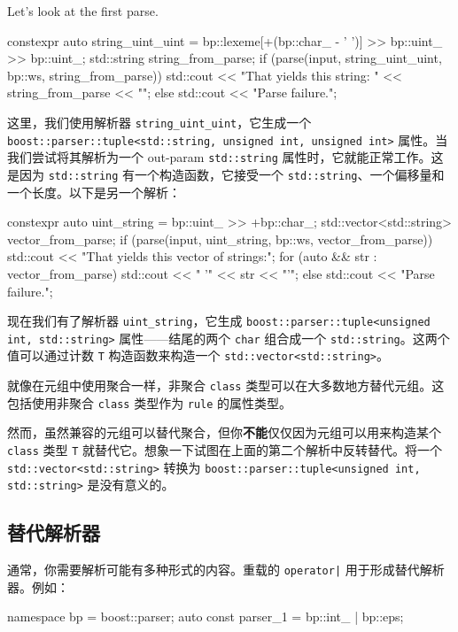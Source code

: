 Let's look at the first parse.

\begin{code}
constexpr auto string_uint_uint =
    bp::lexeme[+(bp::char_ - ' ')] >> bp::uint_ >> bp::uint_;
std::string string_from_parse;
if (parse(input, string_uint_uint, bp::ws, string_from_parse))
    std::cout << "That yields this string: " << string_from_parse << "\n";
else
    std::cout << "Parse failure.\n";
\end{code}

这里，我们使用解析器 \texttt{string\_uint\_uint}，它生成一个 \texttt{boost::parser::tuple<std::string, unsigned int, unsigned int>} 属性。当我们尝试将其解析为一个 out-param \texttt{std::string} 属性时，它就能正常工作。这是因为 \texttt{std::string} 有一个构造函数，它接受一个 \texttt{std::string}、一个偏移量和一个长度。以下是另一个解析：

\begin{code}
constexpr auto uint_string = bp::uint_ >> +bp::char_;
std::vector<std::string> vector_from_parse;
if (parse(input, uint_string, bp::ws, vector_from_parse)) {
    std::cout << "That yields this vector of strings:\n";
    for (auto && str : vector_from_parse) {
        std::cout << "  '" << str << "'\n";
    }
} else {
    std::cout << "Parse failure.\n";
}
\end{code}

现在我们有了解析器 \texttt{uint\_string}，它生成 \texttt{boost::parser::tuple<unsigned int, std::string>} 属性——结尾的两个 \texttt{char} 组合成一个 \texttt{std::string}。这两个值可以通过计数 \texttt{T} 构造函数来构造一个 \texttt{std::vector<std::string>}。

就像在元组中使用聚合一样，非聚合 \texttt{class} 类型可以在大多数地方替代元组。这包括使用非聚合 \texttt{class} 类型作为 \texttt{rule} 的属性类型。

然而，虽然兼容的元组可以替代聚合，但你\textbf{不能}仅仅因为元组可以用来构造某个 \texttt{class} 类型 \texttt{T} 就替代它。想象一下试图在上面的第二个解析中反转替代。将一个 \texttt{std::vector<std::string>} 转换为 \texttt{boost::parser::tuple<unsigned int, std::string>} 是没有意义的。

\subsection{替代解析器}

通常，你需要解析可能有多种形式的内容。重载的 \texttt{operator|} 用于形成替代解析器。例如：

\begin{code}
namespace bp = boost::parser;
auto const parser_1 = bp::int_ | bp::eps;
\end{code}


